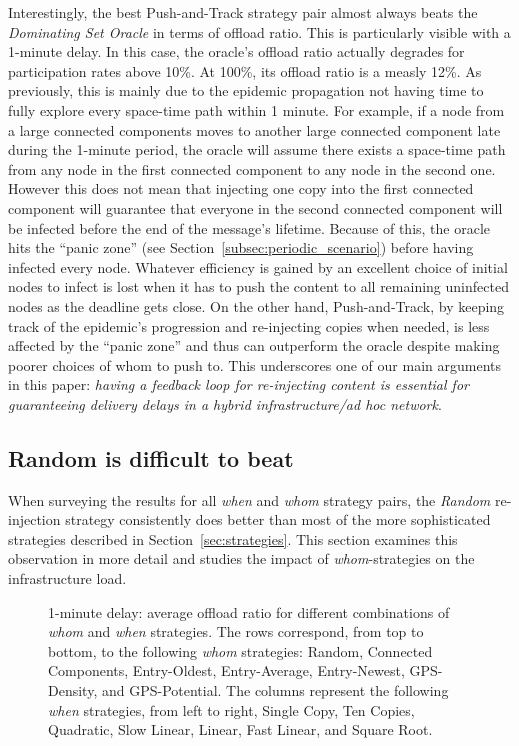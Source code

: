 \documentclass[preprint]{elsarticle}
\begin{document}
Interestingly, the best Push-and-Track strategy pair almost always beats the \textit{Dominating Set Oracle} in terms of offload ratio. This is particularly visible with a 1-minute delay. In this case, the oracle's offload ratio actually degrades for participation rates above 10\%. At 100\%, its offload ratio is a measly 12\%. As previously, this is mainly due to the epidemic propagation not having time to fully explore every space-time path within 1 minute. For example, if a node from a large connected components moves to another large connected component late during the 1-minute period, the oracle will assume there exists a space-time path from any node in the first connected component to any node in the second one. However this does not mean that injecting one copy into the first connected component will guarantee that everyone in the second connected component will be infected before the end of the message's lifetime. Because of this, the oracle hits the ``panic zone'' (see Section~\ref{subsec:periodic_scenario}) before having infected every node. Whatever efficiency is gained by an excellent choice of initial nodes to infect is lost when it has to push the content to all remaining uninfected nodes as the deadline gets close. On the other hand, Push-and-Track, by keeping track of the epidemic's progression and re-injecting copies when needed, is less affected by the ``panic zone'' and thus can outperform the oracle despite making poorer choices of whom to push to. This underscores one of our main arguments in this paper: \textit{having a feedback loop for re-injecting content is essential for guaranteeing delivery delays in a hybrid infrastructure/ad hoc network}.

\subsection{Random is difficult to beat}
\label{subsec:beating_random}

When surveying the results for all \textit{when} and \textit{whom} strategy pairs, the \textit{Random} re-injection strategy consistently does better than most of the more sophisticated strategies described in Section~\ref{sec:strategies}. This section examines this observation in more detail and studies the impact of \textit{whom}-strategies on the infrastructure load.

\begin{figure}[t]
  \centering
  \caption{1-minute delay: average offload ratio for different combinations of \textit{whom} and \textit{when} strategies. The rows correspond, from top to bottom, to the following \textit{whom} strategies: Random, Connected Components, Entry-Oldest, Entry-Average, Entry-Newest, GPS-Density, and GPS-Potential. The columns represent the following \textit{when} strategies, from left to right, Single Copy, Ten Copies, Quadratic, Slow Linear, Linear, Fast Linear, and Square Root.}
  \label{fig:matrix_1}
\end{figure}
\end{document}
